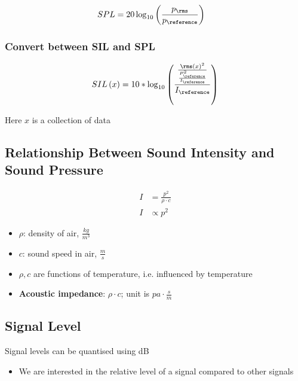     \begin{align}
      SPL &= 20 \log_{10}\left( \frac{p_{\rms}}{p_{\reference}} \right)
    \end{align}

    \subsubsection{Convert between SIL and SPL}

      \begin{equation}
        SIL\left( x \right) = 10 * \log_{10}
        \left(
          \frac
          {
            \frac
            {
              \rms\left( x \right)^{2}
            }
            {
              \frac{P_{\reference}^{2}}{I_{\reference}}
            }
          }
          {I_{\reference}}
        \right)
      \end{equation}

      Here $ x $ is a collection of data

  \subsection{Relationship Between Sound Intensity and Sound Pressure}

    \begin{align}
      I &= \frac{p^{2}}{\rho \cdot c} \\
      I &\propto p^{2}
    \end{align}

    \begin{itemize}
      \item $ \rho $: density of air, $ \frac{kg}{m^{3}} $
      \item $ c $: sound speed in air, $ \frac{m}{s} $
      \item $ \rho, c $ are functions of temperature, i.e. influenced by
      temperature
      \item \textbf{Acoustic impedance}: $ \rho \cdot c $;
      unit is $ pa \cdot \frac{s}{m} $
    \end{itemize}

  \subsection{Signal Level}

    Signal levels can be quantised using dB

    \begin{itemize}
      \item We are interested in the relative level of a signal compared to
      other signals
    \end{itemize}

